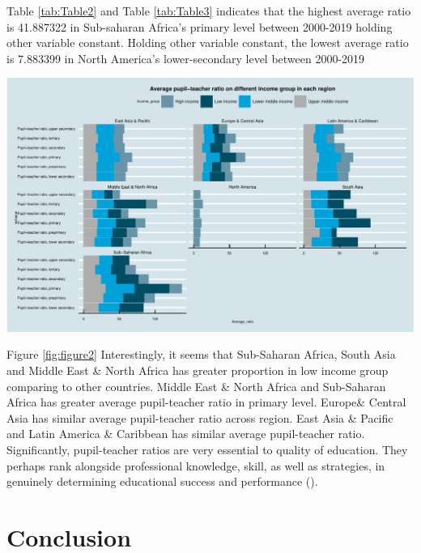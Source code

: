 \documentclass[11pt,a4paper,]{article}
\begin{document}
Table \ref{tab:Table2} and Table \ref{tab:Table3} indicates that the highest average ratio is 41.887322 in Sub-saharan Africa's primary level between 2000-2019 holding other variable constant. Holding other variable constant, the lowest average ratio is 7.883399 in North America's lower-secondary level between 2000-2019

\includegraphics{report_files/figure-latex/figure2-1}

Figure \ref{fig:figure2} Interestingly, it seems that Sub-Saharan Africa, South Asia and Middle East \& North Africa has greater proportion in low income group comparing to other countries. Middle East \& North Africa and Sub-Saharan Africa has greater average pupil-teacher ratio in primary level. Europe\& Central Asia has similar average pupil-teacher ratio across region. East Asia \& Pacific and Latin America \& Caribbean has similar average pupil-teacher ratio. Significantly, pupil-teacher ratios are very essential to quality of education. They perhaps rank alongside professional knowledge, skill, as well as strategies, in genuinely determining educational success and performance (\textcite{ikediashi2012pupil}).

\section*{Conclusion}

\printbibliography
\end{document}
